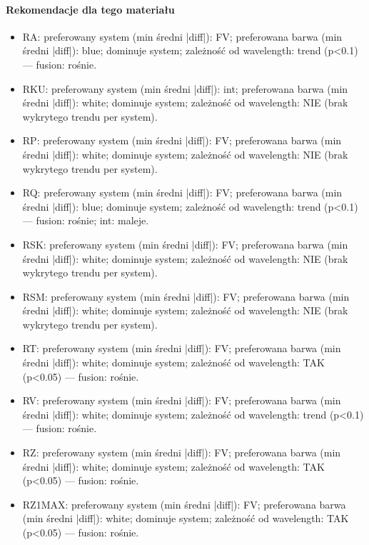 \documentclass[
  10pt,
]{article}
\begin{document}
\paragraph{Rekomendacje dla tego materiału}
\begin{itemize}
\item RA: preferowany system (min średni |diff|): FV; preferowana barwa (min średni |diff|): blue; dominuje system; zależność od wavelength: trend (p<0.1) — fusion: rośnie.
\item RKU: preferowany system (min średni |diff|): int; preferowana barwa (min średni |diff|): white; dominuje system; zależność od wavelength: NIE (brak wykrytego trendu per system).
\item RP: preferowany system (min średni |diff|): FV; preferowana barwa (min średni |diff|): white; dominuje system; zależność od wavelength: NIE (brak wykrytego trendu per system).
\item RQ: preferowany system (min średni |diff|): FV; preferowana barwa (min średni |diff|): blue; dominuje system; zależność od wavelength: trend (p<0.1) — fusion: rośnie; int: maleje.
\item RSK: preferowany system (min średni |diff|): FV; preferowana barwa (min średni |diff|): white; dominuje system; zależność od wavelength: NIE (brak wykrytego trendu per system).
\item RSM: preferowany system (min średni |diff|): FV; preferowana barwa (min średni |diff|): white; dominuje system; zależność od wavelength: NIE (brak wykrytego trendu per system).
\item RT: preferowany system (min średni |diff|): FV; preferowana barwa (min średni |diff|): white; dominuje system; zależność od wavelength: TAK (p<0.05) — fusion: rośnie.
\item RV: preferowany system (min średni |diff|): FV; preferowana barwa (min średni |diff|): white; dominuje system; zależność od wavelength: trend (p<0.1) — fusion: rośnie.
\item RZ: preferowany system (min średni |diff|): FV; preferowana barwa (min średni |diff|): white; dominuje system; zależność od wavelength: TAK (p<0.05) — fusion: rośnie.
\item RZ1MAX: preferowany system (min średni |diff|): FV; preferowana barwa (min średni |diff|): white; dominuje system; zależność od wavelength: TAK (p<0.05) — fusion: rośnie.
\end{itemize}
\end{document}
